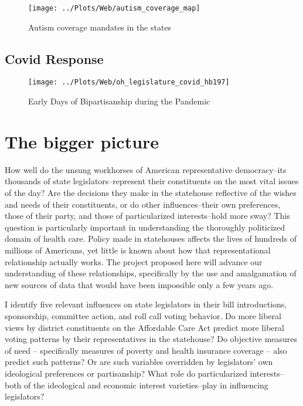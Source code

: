 \documentclass[
  oneside]{book}
\begin{document}
\begin{figure}
\texttt{[image: ../Plots/Web/autism\_coverage\_map]} \caption{Autism coverage mandates in the states}\label{fig:autism-map}
\end{figure}

\hypertarget{covid-response}{%
\subsection{Covid Response}\label{covid-response}}

\begin{figure}
\texttt{[image: ../Plots/Web/oh\_legislature\_covid\_hb197]} \caption{Early Days of Bipartisanship during the Pandemic}\label{fig:covid-oh}
\end{figure}

\hypertarget{the-bigger-picture}{%
\section{The bigger picture}\label{the-bigger-picture}}

How well do the unsung workhorses of American representative democracy--its thousands of state legislators--represent their constituents on the most vital issues of the day? Are the decisions they make in the statehouse reflective of the wishes and needs of their constituents, or do other influences--their own preferences, those of their party, and those of particularized interests--hold more sway? This question is particularly important in understanding the thoroughly politicized domain of health care. Policy made in statehouses affects the lives of hundreds of millions of Americans, yet little is known about how that representational relationship actually works. The project proposed here will advance our understanding of these relationships, specifically by the use and amalgamation of new sources of data that would have been impossible only a few years ago.

I identify five relevant influences on state legislators in their bill introductions, sponsorship, committee action, and roll call voting behavior. Do more liberal views by district constituents on the Affordable Care Act predict more liberal voting patterns by their representatives in the statehouse? Do objective measures of need -- specifically measures of poverty and health insurance coverage -- also predict such patterns? Or are such variables overridden by legislators' own ideological preferences or partisanship? What role do particularized interests--both of the ideological and economic interest varieties--play in influencing legislators?
\end{document}
